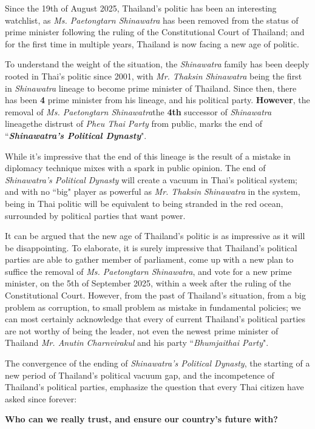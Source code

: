 \documentclass[11pt]{article}
\begin{document}
Since the 19th of August 2025, Thailand's politic has been an interesting watchlist, as \textit{Ms. Paetongtarn Shinawatra} has been removed from the status of prime minister following the ruling of the Constitutional Court of Thailand; and for the first time in multiple years, Thailand is now facing a new age of politic.

To understand the weight of the situation, the \textit{Shinawatra} family has been deeply rooted in Thai's politic since 2001, with \textit{Mr. Thaksin Shinawatra} being the first in \textit{Shinawatra} lineage to become prime minister of Thailand. Since then, there has been \textbf{4} prime minister from his lineage, and his political party. \textbf{However}, the removal of \textit{Ms. Paetongtarn Shinawatra}\textemdash the \textbf{4th} successor of \textit{Shinawatra} lineage\textemdash the distrust of \textit{Pheu Thai Party} from public, marks the end of ``\textbf{\textit{Shinawatra's Political Dynasty}}".

While it's impressive that the end of this lineage is the result of a mistake in diplomacy technique mixes with a spark in public opinion. The end of \textit{Shinawatra's Political Dynasty} will create a vacuum in Thai's political system; and with no ``big" player as powerful as  \textit{Mr. Thaksin Shinawatra} in the system, being in Thai politic will be equivalent to being stranded in the red ocean, surrounded by political parties that want power.

It can be argued that the new age of Thailand's politic is as impressive as it will be disappointing. To elaborate, it is surely impressive that Thailand's political parties are able to gather member of parliament, come up with a new plan to suffice the removal of \textit{Ms. Paetongtarn Shinawatra}, and vote for a new prime minister, on the 5th of September 2025, within a week after the ruling of the Constitutional Court. However, from the past of Thailand's situation, from a big problem as corruption, to small problem as mistake in fundamental policies; we can most certainly acknowledge that every of current Thailand's political parties are not worthy of being the leader, not even the newest prime minister of Thailand \textit{Mr. Anutin Charnvirakul} and his party ``\textit{Bhumjaithai Party}".

The convergence of the ending of \textit{Shinawatra's Political Dynasty}, the starting of a new period of Thailand's political vacuum gap, and the incompetence of Thailand's political parties, emphasize the question that every Thai citizen have asked since forever:

\begin{center}
	\textbf{Who can we really trust, and ensure our country's future with?}
\end{center}
\end{document}
